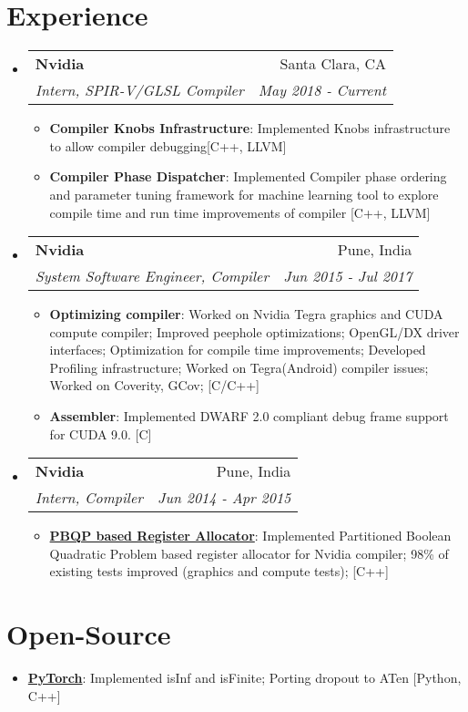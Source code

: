 \documentclass[letterpaper,11pt]{article}
\makeatletter
\newcommand{\resumeItem}[2]{
  \item\small{
    \textbf{#1}{: #2 \vspace{-2pt}}
  }
}
\newcommand{\resumeSubheading}[4]{
  \vspace{-1pt}\item
    \begin{tabular*}{0.97\textwidth}{l@{\extracolsep{\fill}}r}
      \textbf{#1} & #2 \\
      \textit{\small#3} & \textit{\small #4} \\
    \end{tabular*}\vspace{-5pt}
}
\newcommand{\resumeSubItem}[2]{\resumeItem{#1}{#2}\vspace{-4pt}}
\newcommand{\resumeSubHeadingListStart}{\begin{itemize}[leftmargin=*]}
\newcommand{\resumeSubHeadingListEnd}{\end{itemize}}
\newcommand{\resumeItemListStart}{\begin{itemize}}
\newcommand{\resumeItemListEnd}{\end{itemize}\vspace{-5pt}}
\makeatother
\begin{document}
\section{Experience}
  \resumeSubHeadingListStart
    \resumeSubheading
      {Nvidia}{Santa Clara, CA}
      {Intern, SPIR-V/GLSL Compiler}{May 2018 - Current}
      \resumeItemListStart
        \resumeSubItem{Compiler Knobs Infrastructure}
        {Implemented Knobs infrastructure to allow compiler debugging[C++, LLVM]}
        \resumeSubItem{Compiler Phase Dispatcher}
        {Implemented Compiler phase ordering and parameter tuning framework for machine learning tool to explore compile time and run time improvements of compiler [C++, LLVM]}
      \resumeItemListEnd
    \resumeSubheading
      {Nvidia}{Pune, India}
      {System Software Engineer, Compiler}{Jun 2015 - Jul 2017}
      \resumeItemListStart
        \resumeSubItem{Optimizing compiler} {Worked on Nvidia Tegra graphics and CUDA compute compiler; Improved peephole optimizations; OpenGL/DX driver interfaces; Optimization for compile time improvements; Developed Profiling infrastructure; Worked on Tegra(Android) compiler issues; Worked on Coverity, GCov; [C/C++]}
        \resumeSubItem{Assembler}{Implemented DWARF 2.0 compliant debug frame support for CUDA 9.0. [C]}
      \resumeItemListEnd

    \resumeSubheading
      {Nvidia}{Pune, India}
      {Intern, Compiler}{Jun 2014 - Apr 2015}
      \resumeItemListStart
        \resumeSubItem{\href{http://slides.com/bhushansonawane/deck/}{ PBQP based Register Allocator}}{Implemented Partitioned Boolean Quadratic Problem based register allocator for Nvidia compiler; 98\% of existing tests improved (graphics and compute tests); [C++]}
      \resumeItemListEnd
  \resumeSubHeadingListEnd

\section{Open-Source}
\resumeSubHeadingListStart
\resumeSubItem{\href{https://github.com/pytorch/pytorch}{PyTorch}}{Implemented isInf and isFinite; Porting dropout to ATen [Python, C++]}
\resumeItemListEnd

\end{document}

